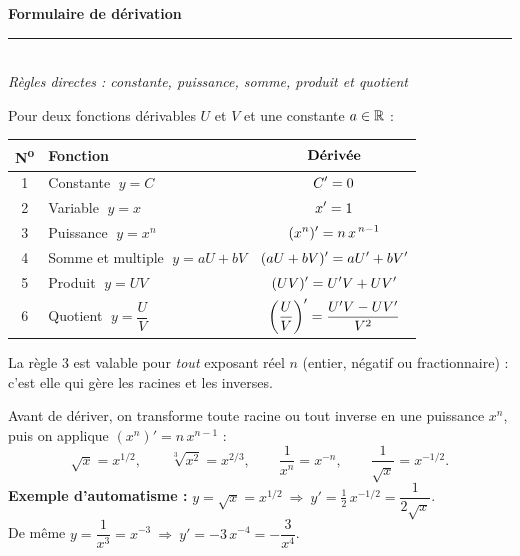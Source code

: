 \pagestyle{fancy}\fancyhf{}
\fancyfoot[C]{\small\thepage}
\renewcommand{\headrulewidth}{0.8pt}



\begin{center}
{\LARGE\bfseries\color{primarydark} Formulaire de dérivation}\\[2pt]
{\color{primary}\rule{0.5\textwidth}{1.2pt}}\\[4pt]
{\small\itshape Règles directes : constante, puissance, somme, produit et quotient}
\end{center}
\vspace{2mm}

\begin{cle}
Pour deux fonctions dérivables $U$ et $V$ et une constante $a\in\R$ :
\begin{center}
\renewcommand{\arraystretch}{1.5}
\begin{tabular}{@{}c l >{$\ds}c<{$}@{}}
\toprule
\textbf{N\textsuperscript{o}} & \textbf{Fonction} & \textbf{Dérivée} \\
\midrule
1 & Constante $\;y=C$ & C'=0 \\
2 & Variable $\;y=x$ & x'=1 \\
3 & Puissance $\;y=x^{n}$ & (x^{n})'=n\,x^{\,n-1} \\
4 & Somme et multiple $\;y=aU+bV$ & (aU+bV)'=aU'+bV' \\
5 & Produit $\;y=UV$ & (UV)'=U'V+UV' \\
6 & Quotient $\;y=\dfrac{U}{V}$ & \left(\frac{U}{V}\right)'=\frac{U'V-UV'}{V^{2}} \\
\bottomrule
\end{tabular}
\end{center}
La règle 3 est valable pour \emph{tout} exposant réel $n$ (entier, négatif ou fractionnaire) : c'est elle qui gère les racines et les inverses.
\end{cle}

\begin{methode}
Avant de dériver, on transforme toute racine ou tout inverse en une puissance $x^{n}$, puis on applique $(x^{n})'=n\,x^{n-1}$ :
\[
\sqrt{x}=x^{1/2},\qquad \sqrt[3]{x^{2}}=x^{2/3},\qquad \frac{1}{x^{n}}=x^{-n},\qquad \frac{1}{\sqrt{x}}=x^{-1/2}.
\]
\textbf{Exemple d'automatisme :} $y=\sqrt{x}=x^{1/2}\ \Rightarrow\ y'=\tfrac12\,x^{-1/2}=\dfrac{1}{2\sqrt{x}}$.\\
De même $y=\dfrac{1}{x^{3}}=x^{-3}\ \Rightarrow\ y'=-3\,x^{-4}=-\dfrac{3}{x^{4}}$.
\end{methode}


